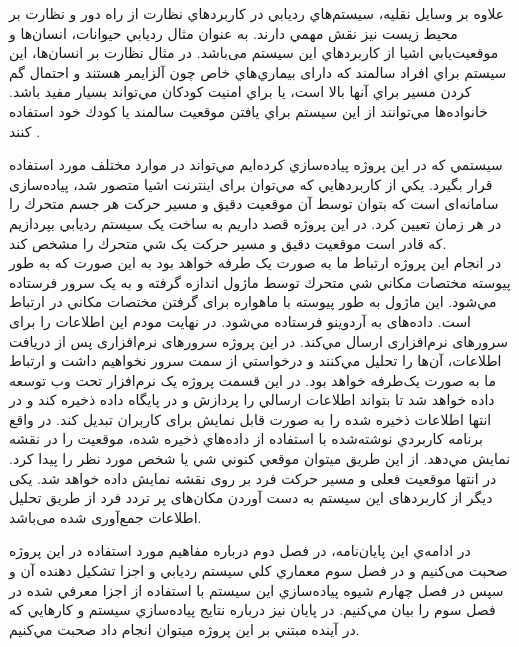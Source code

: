 علاوه بر وسايل نقليه، سيستم‌هاي رديابي در كاربردهاي نظارت از راه دور و نظارت بر محیط زیست نيز نقش مهمي دارند. به عنوان مثال رديابي حيوانات، انسان‌ها و موقعيت‌يابي اشيا از كاربردهاي اين سيستم می‌باشد. در مثال نظارت بر انسان‌ها، اين سيستم براي افراد سالمند كه دارای بيماري‌هاي خاص چون آلزايمر هستند و احتمال گم كردن مسير براي آنها بالا است، يا براي امنيت كودكان مي‌تواند بسيار مفيد باشد. خانواده‌ها مي‌توانند از اين سيستم براي يافتن موقعيت سالمند يا كودك خود استفاده كنند \cite{Saranya2013}. 


سيستمي كه در اين پروژه پياده‌سازي كرده‌ايم مي‌تواند در موارد مختلف مورد استفاده قرار بگيرد.
يکي از كاربردهايي كه مي‌توان برای اينترنت اشيا متصور شد، پياده‌سازی سامانه‌ای است كه بتوان توسط آن موقعيت دقيق و مسير حركت هر جسم متحرك را در هر زمان تعيين كرد. در اين پروژه قصد داريم به ساخت يک سيستم رديابي بپردازيم كه قادر است موقعيت دقيق و مسير حركت يک شي متحرك را مشخص كند. \\در انجام اين پروژه ارتباط ما به صورت يک طرفه خواهد بود به اين صورت كه به طور پيوسته مختصات مکاني شي متحرك توسط ماژول  اندازه گرفته و به يک سرور فرستاده مي‌شود. اين ماژول به طور پيوسته با ماهواره برای گرفتن مختصات مکاني در ارتباط است. داده‌های  به آردوينو فرستاده مي‌شود. در نهايت مودم  اين اطلاعات را برای سرورهای نرم‌افزاری ارسال مي‌كند. در اين پروژه سرورهای نرم‌افزاری پس از دريافت اطلاعات، آن‌ها را تحليل مي‌كنند و درخواستي از سمت سرور نخواهيم داشت و ارتباط ما به صورت يک‌طرفه خواهد بود. در اين قسمت پروژه يک نرم‌افزار تحت وب توسعه داده خواهد شد تا بتواند اطلاعات ارسالي را پردازش و در پایگاه داده ذخيره كند و در انتها اطلاعات ذخيره شده را به صورت قابل نمايش برای كاربران تبديل كند. در واقع برنامه كاربردي نوشته‌شده با استفاده از داده‌هاي ذخیره شده، موقعيت را در نقشه نمايش مي‌دهد. از اين طريق ميتوان موقعي كنوني شي يا شخص مورد نظر را پيدا كرد. در انتها موقعیت فعلی و مسیر حرکت فرد بر روی نقشه نمایش داده خواهد شد. یکی دیگر از کاربردهای این سیستم به دست آوردن مکان‌های پر تردد فرد از طریق تحلیل اطلاعات جمع‌آوری شده می‌باشد.


در ادامه‌ي اين پايان‌نامه، در فصل دوم درباره مفاهیم مورد استفاده در این پروژه صحبت می‌کنیم و در فصل سوم معماري كلي سيستم رديابي و اجزا تشكيل دهنده آن و سپس در فصل چهارم شيوه پياده‌سازي اين سيستم با استفاده از اجزا معرفي شده در فصل سوم را بيان مي‌كنيم. در پايان نيز درباره نتايج پياده‌سازي سيستم و كارهايي كه در آينده مبتني بر اين پروژه ميتوان انجام داد صحبت مي‌كنيم.
